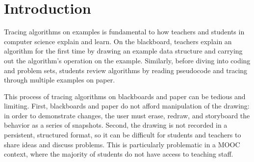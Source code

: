 \section{Introduction}

Tracing algorithms on examples is fundamental to how teachers and students in
computer science explain and learn. On the blackboard, teachers explain an
algorithm for the first time by drawing an example data structure and carrying
out the algorithm's operation on the example. Similarly, before diving into
coding and problem sets, students review algorithms by reading pseudocode and
tracing through multiple examples on paper.

This process of tracing algorithms on blackboards and paper can be tedious and
limiting. First, blackboards and paper do not afford manipulation of the
drawing: in order to demonstrate changes, the user must erase, redraw, and
storyboard the behavior as a series of snapshots.
Second, the drawing is not recorded in a persistent, structured format, so it
can be difficult for students and teachers to share ideas and discuss problems.
This is particularly problematic in a MOOC context, where the majority of
students do not have access to teaching staff.

